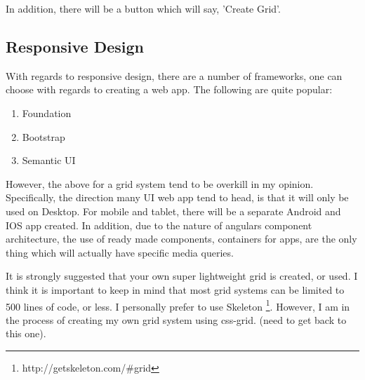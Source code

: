 In addition, there will be a button which will say, 'Create Grid'.


\subsection{ Responsive Design }
With regards to responsive design, there are a number of frameworks, one can
choose with regards to creating a web app. The following are quite popular:
\begin{enumerate}
  \item Foundation
  \item Bootstrap
  \item Semantic UI
\end{enumerate}

However, the above for a grid system tend to be overkill in my opinion.
Specifically, the direction many UI web app tend to head, is that it will only
be used on Desktop. For mobile and tablet, there will be a separate Android and
IOS app created. In addition, due to the nature of angulars component
architecture, the use of ready made components, containers for apps, are the
only thing which will actually have specific media queries.

It is strongly suggested that your own super lightweight grid is created, or
used. I think it is important to keep in mind that most grid systems can be
limited to 500 lines of code, or less. I personally prefer to use Skeleton
\footnote{http://getskeleton.com/\#grid}. However, I am in the process of
creating my own grid system using css-grid. (need to get back to this one).
